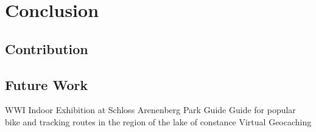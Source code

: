 
\chapter{Conclusion} %

\label{conclusion} %



\section{Contribution}

\section{Future Work}

WWI Indoor Exhibition at Schloss Arenenberg
Park Guide
Guide for popular bike and tracking routes in the region of the lake of constance
Virtual Geocaching